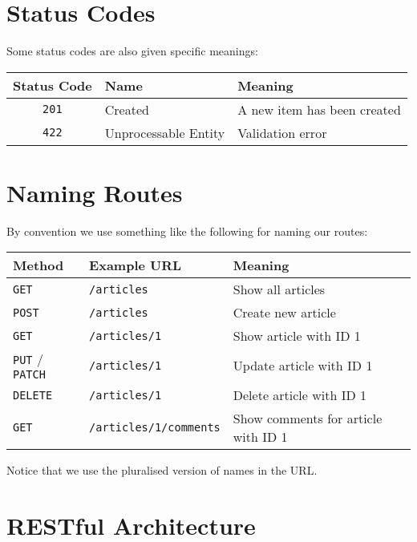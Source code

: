 \section{Status Codes}

Some status codes are also given specific meanings:
\\

\begin{tabu}{| c | l | X |}
    \hline
    \textbf{Status Code} & \textbf{Name} & \textbf{Meaning} \\
    \hline
    \texttt{201} & Created & A new item has been created \\
    \texttt{422} & Unprocessable Entity & Validation error \\
    \hline
\end{tabu}



\section{Naming Routes}

By convention we use something like the following for naming our routes:
\\

\begin{tabu}{| l | l | X |}
    \hline
    \textbf{Method} & \textbf{Example URL} & \textbf{Meaning} \\
    \hline
    \texttt{GET} & \texttt{/articles} & Show all articles\\
    \texttt{POST} & \texttt{/articles} & Create new article\\
    \texttt{GET} & \texttt{/articles/1} & Show article with ID 1\\
    \texttt{PUT} / \texttt{PATCH} & \texttt{/articles/1} & Update article with ID 1\\
    \texttt{DELETE} & \texttt{/articles/1} & Delete article with ID 1\\
    \texttt{GET} & \texttt{/articles/1/comments} & Show comments for article with ID 1\\
    \hline
\end{tabu}

\par\bigskip

Notice that we use the pluralised version of names in the URL.


\pagebreak


\section{RESTful Architecture}

